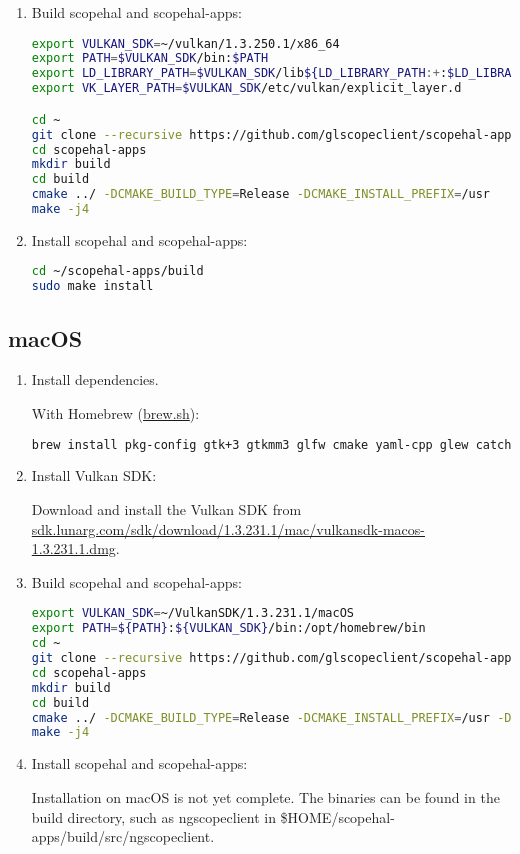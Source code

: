\begin{enumerate}
\item Build scopehal and scopehal-apps:

\begin{lstlisting}[language=sh, numbers=none]
export VULKAN_SDK=~/vulkan/1.3.250.1/x86_64
export PATH=$VULKAN_SDK/bin:$PATH
export LD_LIBRARY_PATH=$VULKAN_SDK/lib${LD_LIBRARY_PATH:+:$LD_LIBRARY_PATH}
export VK_LAYER_PATH=$VULKAN_SDK/etc/vulkan/explicit_layer.d

cd ~
git clone --recursive https://github.com/glscopeclient/scopehal-apps.git
cd scopehal-apps
mkdir build
cd build
cmake ../ -DCMAKE_BUILD_TYPE=Release -DCMAKE_INSTALL_PREFIX=/usr
make -j4
\end{lstlisting}

\item Install scopehal and scopehal-apps:

\begin{lstlisting}[language=sh, numbers=none]
cd ~/scopehal-apps/build
sudo make install
\end{lstlisting}

\end{enumerate}

\subsection{macOS}
\begin{enumerate}

\item Install dependencies.

With Homebrew (\href{https://brew.sh}{brew.sh}):

\begin{lstlisting}[language=sh, numbers=none]
brew install pkg-config gtk+3 gtkmm3 glfw cmake yaml-cpp glew catch2 libomp
\end{lstlisting}

\item Install Vulkan SDK:

Download and install the Vulkan SDK from \href{https://sdk.lunarg.com/sdk/download/1.3.231.1/mac/vulkansdk-macos-1.3.231.1.dmg}{sdk.lunarg.com/sdk/download/1.3.231.1/mac/vulkansdk-macos-1.3.231.1.dmg}.

\item Build scopehal and scopehal-apps:

\begin{lstlisting}[language=sh, numbers=none]
export VULKAN_SDK=~/VulkanSDK/1.3.231.1/macOS
export PATH=${PATH}:${VULKAN_SDK}/bin:/opt/homebrew/bin
cd ~
git clone --recursive https://github.com/glscopeclient/scopehal-apps.git
cd scopehal-apps
mkdir build
cd build
cmake ../ -DCMAKE_BUILD_TYPE=Release -DCMAKE_INSTALL_PREFIX=/usr -DCMAKE_PREFIX_PATH="/opt/homebrew;/opt/homebrew/opt/libomp"
make -j4
\end{lstlisting}

\item Install scopehal and scopehal-apps:

Installation on macOS is not yet complete.
The binaries can be found in the build directory, such as ngscopeclient in \$HOME/scopehal-apps/build/src/ngscopeclient.

\end{enumerate}

